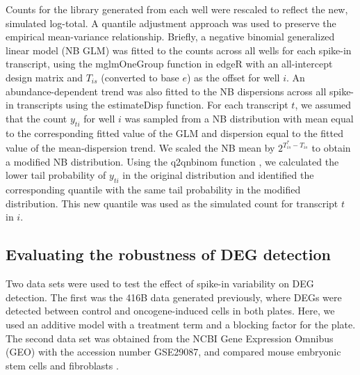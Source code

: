 \documentclass{article}
\begin{document}
Counts for the library generated from each well were rescaled to reflect the new, simulated log-total.
A quantile adjustment approach was used to preserve the empirical mean-variance relationship.
Briefly, a negative binomial generalized linear model (NB GLM) was fitted to the counts across all wells for each spike-in transcript, using the mglmOneGroup function in edgeR \cite{mccarthy2012differential, robinson2010edgeR} with an all-intercept design matrix and $T_{is}$ (converted to base $e$) as the offset for well $i$.
An abundance-dependent trend was also fitted to the NB dispersions across all spike-in transcripts using the estimateDisp function.
For each transcript $t$, we assumed that the count $y_{ti}$ for well $i$ was sampled from a NB distribution with mean equal to the corresponding fitted value of the GLM and dispersion equal to the fitted value of the mean-dispersion trend.
We scaled the NB mean by $2^{T^*_{is} - T_{is}}$ to obtain a modified NB distribution.
Using the q2qnbinom function \cite{robinson2008small}, we calculated the lower tail probability of $y_{ti}$ in the original distribution and identified the corresponding quantile with the same tail probability in the modified distribution.
This new quantile was used as the simulated count for transcript $t$ in $i$.


\subsection{Evaluating the robustness of DEG detection}
Two data sets were used to test the effect of spike-in variability on DEG detection.
The first was the 416B data generated previously, where DEGs were detected between control and oncogene-induced cells in both plates.
Here, we used an additive model with a treatment term and a blocking factor for the plate.
The second data set was obtained from the NCBI Gene Expression Omnibus (GEO) with the accession number GSE29087, and compared mouse embryonic stem cells and fibroblasts \cite{islam2011characterization}.
\end{document}
